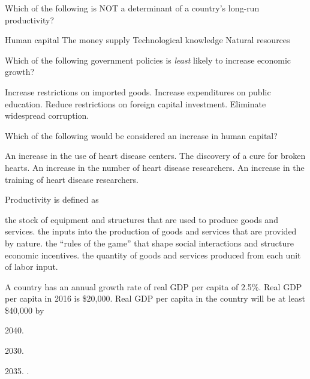 \documentclass[addpoints,11pt]{exam}
\theoremstyle{definition}
\begin{document}
\begin{questions}

\question Which of the following is NOT a determinant of a country's long-run productivity?

\begin{choices} 
	\choice Human capital
	\CorrectChoice The money supply
	\choice Technological knowledge
	\choice Natural resources
\end{choices} 




\question Which of the following government policies is \textit{least} likely to increase economic growth?

\begin{choices}
	\CorrectChoice Increase restrictions on imported goods.
	\choice Increase expenditures on public education.
	\choice Reduce restrictions on foreign capital investment.
	\choice Eliminate widespread corruption.
\end{choices} 


	\question Which of the following would be considered an increase in human capital?

\begin{choices}
	\choice An increase in the use of heart disease centers.
	\choice The discovery of a cure for broken hearts.
	\choice An increase in the number of heart disease researchers.
	\CorrectChoice An increase in the training of heart disease researchers.
\end{choices}

\newpage

\question Productivity is defined as 

\begin{choices}
	\choice the stock of equipment and structures that are used to produce goods and services.
	\choice the inputs into the production of goods and services that are provided by nature.
	\choice the ``rules of the game'' that shape social interactions and structure economic incentives.
	\CorrectChoice the quantity of goods and services produced from each unit of labor input.
\end{choices}


\question A country has an annual growth rate of real GDP per capita of 2.5\%. Real GDP per capita in 2016 is \$20,000. Real GDP per capita in the country will be at least \$40,000 by

\begin{choices}
	\item 2040.
	\item 2030.
	\item 2035.
	.
\end{choices}



\end{questions}
\end{document}
